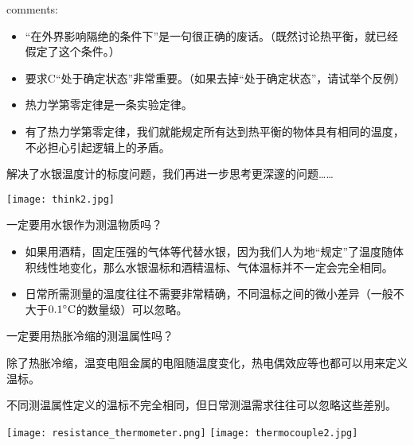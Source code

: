 \documentclass[CJK]{beamer}
\begin{document}
\begin{frame}
\bch
{\large {}}

\skiplines

comments:
\begin{itemize}
\item{“在外界影响隔绝的条件下”是一句很正确的废话。{\small（既然讨论热平衡，就已经假定了这个条件。）}}
\item{要求C“处于确定状态”非常重要。（如果去掉“处于确定状态”，请试举个反例）}
\item{热力学第零定律是一条实验定律。}
\item{有了热力学第零定律，我们就能规定所有达到热平衡的物体具有相同的温度，不必担心引起逻辑上的矛盾。}
\end{itemize}
\ech
\end{frame}

\begin{frame}
\bch
解决了水银温度计的标度问题，我们再进一步思考更深邃的问题……
\begin{center}
\texttt{[image: think2.jpg]}
\end{center}
\ech
\end{frame}

\begin{frame}
\bch
一定要用水银作为测温物质吗？

\skiplines

\begin{itemize}
\item{如果用酒精，固定压强的气体等代替水银，因为我们人为地“规定”了温度随体积线性地变化，那么水银温标和酒精温标、气体温标并不一定会完全相同。}
\item{日常所需测量的温度往往不需要非常精确，不同温标之间的微小差异（一般不大于$0.1^\circ \mathrm{C}$的数量级）可以忽略。}
\end{itemize}

\ech
\end{frame}


\begin{frame}
\bch
一定要用热胀冷缩的测温属性吗？

\skipline

\bitem
\item{除了热胀冷缩，温变电阻金属的电阻随温度变化，热电偶效应等也都可以用来定义温标。}
\item{不同测温属性定义的温标不完全相同，但日常测温需求往往可以忽略这些差别。}
\eitem

\bcenter
\texttt{[image: resistance\_thermometer.png]}\hspace{0.1in}
\texttt{[image: thermocouple2.jpg]}
\ecenter
\ech
\end{frame}
\end{document}
